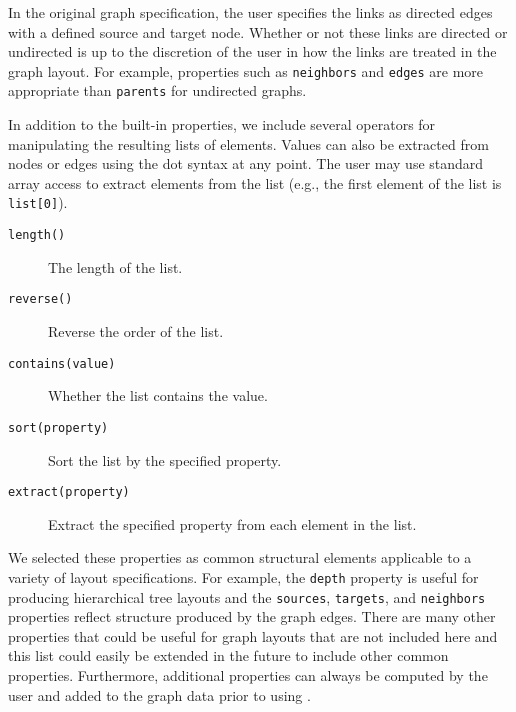 In the original graph specification, the user specifies the links as directed
edges with a defined source and target node. Whether or not these links are
directed or undirected is up to the discretion of the user in how the links
are treated in the graph layout. For example, properties such as
\texttt{neighbors} and \texttt{edges} are more appropriate than \texttt{parents}
for undirected graphs.

In addition to the built-in properties, we include several operators for 
manipulating the resulting lists of elements. Values can also be extracted from
nodes or edges using the dot syntax at any point. The user may use standard
array access to extract elements from the list (e.g., the first element of
the list is \texttt{list[0]}).

\begin{description}
\item[\texttt{length()}] The length of the list.
\item[\texttt{reverse()}] Reverse the order of the list.
\item[\texttt{contains(value)}] Whether the list contains the value.
\item[\texttt{sort(property)}] Sort the list by the specified property.
\item[\texttt{extract(property)}] Extract the specified property from each element in the list.
\end{description}



We selected these properties as common structural elements
applicable to a variety of layout specifications. For example, the \texttt{depth}
property is useful for producing hierarchical tree layouts and the 
\texttt{sources}, \texttt{targets}, and \texttt{neighbors} properties
reflect structure produced by the graph edges. There are many other
properties that could be useful for graph layouts that are not included 
here and this list could easily be extended in the future to include other
common properties. Furthermore, additional properties can always be
computed by the user and added to the graph data prior to using \projectname.

